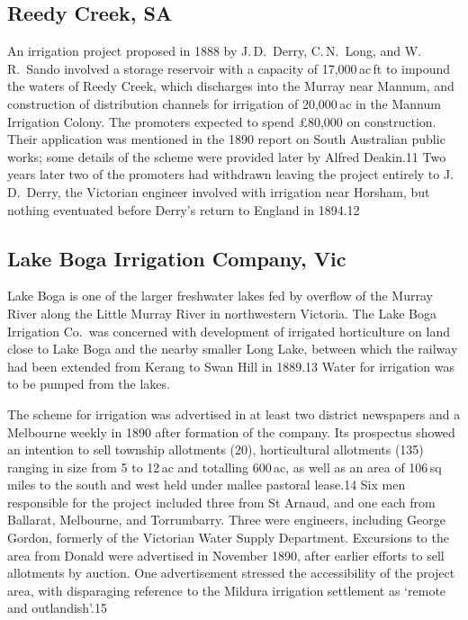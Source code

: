 \subsection{Reedy Creek, SA}

An irrigation project proposed in 1888 by J.\,D.~Derry, C.\,N.~Long,
and W.\,R.~Sando involved a storage reservoir with a capacity of
17,000\,ac\,ft to impound the waters of Reedy Creek, which discharges
into the Murray near Mannum, and construction of distribution channels
for irrigation of 20,000\,ac in the Mannum Irrigation Colony. The
promoters expected to spend \pounds80,000 on construction. Their
application was mentioned in the 1890 report on South Australian
public works; some details of the scheme were provided later by Alfred
Deakin.11 Two years later two of the promoters had withdrawn leaving
the project entirely to J.\,D.~Derry, the Victorian engineer involved
with irrigation near Horsham, but nothing eventuated before Derry's
return to England in 1894.12

\subsection{Lake Boga Irrigation Company, Vic}

Lake Boga is one of the larger freshwater lakes fed by overflow of the
Murray River along the Little Murray River in northwestern
Victoria. The Lake Boga Irrigation Co.\ was concerned with development
of irrigated horticulture on land close to Lake Boga and the nearby
smaller Long Lake, between which the railway had been extended from
Kerang to Swan Hill in 1889.13 Water for irrigation was to be pumped
from the lakes.

The scheme for irrigation was advertised in at least two district
newspapers and a Melbourne weekly in 1890 after formation of the
company. Its prospectus showed an intention to sell township
allotments (20), horticultural allotments (135) ranging in size from 5
to 12\,ac and totalling 600\,ac, as well as an area of 106\,sq miles
to the south and west held under mallee pastoral lease.14 Six men
responsible for the project included three from St Arnaud, and one
each from Ballarat, Melbourne, and Torrumbarry. Three were engineers,
including George Gordon, formerly of the Victorian Water Supply
Department.  Excursions to the area from Donald were advertised in
November 1890, after earlier efforts to sell allotments by auction.
One advertisement stressed the accessibility of the project area, with
disparaging reference to the Mildura irrigation settlement as `remote
and outlandish'.15

